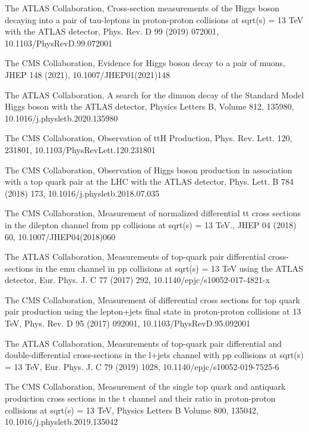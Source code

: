 \begin{thebibliography}{20}
  {The ATLAS Collaboration, Cross-section measurements of the Higgs boson decaying into a pair of tau-leptons in proton-proton collisions at sqrt(s) = 13 TeV with the ATLAS detector, Phys. Rev. D 99 (2019) 072001, 10.1103/PhysRevD.99.072001}
  
  {The CMS Collaboration, Evidence for Higgs boson decay to a pair of muons, JHEP 148 (2021), 10.1007/JHEP01(2021)148}
  
  {The ATLAS Collaboration, A search for the dimuon decay of the Standard Model Higgs boson with the ATLAS detector, Physics Letters B, Volume 812, 135980, 10.1016/j.physletb.2020.135980}
  
  {The CMS Collaboration, Observation of ttH Production, Phys. Rev. Lett. 120, 231801, 10.1103/PhysRevLett.120.231801}
  
  {The CMS Collaboration, Observation of Higgs boson production in association with a top quark pair at the LHC with the ATLAS detector, Phys. Lett. B 784 (2018) 173, 10.1016/j.physletb.2018.07.035}
  
  {The CMS Collaboration, Measurement of normalized differential tt cross sections in the dilepton channel from pp collisions at sqrt(s) = 13 TeV., JHEP 04 (2018) 60, 10.1007/JHEP04(2018)060}
  
  {The ATLAS Collaboration, Measurements of top-quark pair differential cross-sections in the emu channel in pp collisions at sqrt(s) = 13 TeV using the ATLAS detector, Eur. Phys. J. C 77 (2017) 292, 10.1140/epjc/s10052-017-4821-x}
  
  {The CMS Collaboration, Measurement of differential cross sections for top quark pair production using the lepton+jets final state in proton-proton collisions at 13 TeV, Phys. Rev. D 95 (2017) 092001, 10.1103/PhysRevD.95.092001}
  
  {The ATLAS Collaboration, Measurements of top-quark pair differential and double-differential cross-sections in the l+jets channel with pp collisions at sqrt(s) = 13 TeV, Eur. Phys. J. C 79 (2019) 1028, 10.1140/epjc/s10052-019-7525-6}

  {The CMS Collaboration, Measurement of the single top quark and antiquark production cross sections in the t channel and their ratio in proton-proton collisions at sqrt(s) = 13 TeV, Physics Letters B Volume 800, 135042, 10.1016/j.physletb.2019.135042}
 

\end{thebibliography}
